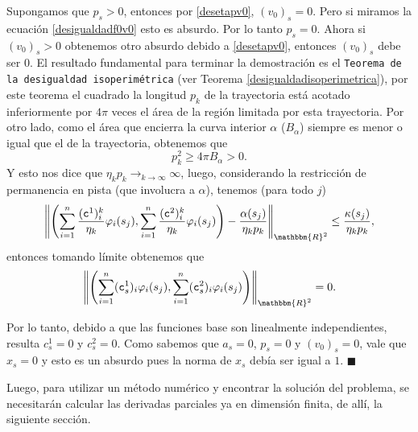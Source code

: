 \documentclass[a4paper,10pt]{book}
\newcommand{\R}{\mathbbm{R}}
\newenvironment{dem}{\vspace*{-0.1cm}{\it Demostraci\'on:}}{\hfill
$\blacksquare$\\}
\begin{document}
\begin{dem}
Supongamos que $p_s>0$, entonces por \eqref{desetapv0}, $(v_0)_s=0$. Pero si miramos la ecuación \eqref{desigualdadf0v0} esto es absurdo. Por lo tanto $p_s=0$. Ahora si $(v_0)_s>0$ obtenemos otro absurdo debido a \eqref{desetapv0}, entonces $(v_0)_s$ debe ser $0$. El resultado fundamental para terminar la demostración es el \texttt{Teorema de la desigualdad isoperimétrica} (ver Teorema \ref{desigualdadisoperimetrica}), por este teorema el cuadrado la longitud $p_k$ de la trayectoria está acotado inferiormente por $4\pi$ veces el área de la región limitada por esta trayectoria. Por otro lado, como el área que encierra la curva interior $\alpha$ ($B_\alpha$) siempre es menor o igual que el de la trayectoria, obtenemos que
\begin{equation*}
    p_k^2\geq 4\pi B_\alpha>0.
\end{equation*}
Y esto nos dice que $\displaystyle \eta_kp_k\mathop{\longrightarrow}_{k\to\infty}\infty$, luego, considerando la restricción de permanencia en pista (que involucra a $\alpha$), tenemos (para todo $j$)
\begin{equation*}
    \left\| \left(\sum_{i=1}^n\frac{(\texttt{c}^{1})^k_i}{\eta_k}\varphi_i(s_j), \sum_{i=1}^n\frac{(\texttt{c}^{2})^k_i}{\eta_k}\varphi_i(s_j)\right)-\frac{\alpha(s_j)}{\eta_kp_k} \right\|_{\R^2} \leq \frac{\kappa(s_j)}{\eta_kp_k},
\end{equation*}
entonces tomando límite obtenemos que
\[
 \left\|\left(\sum_{i=1}^n(\texttt{c}^1_s)_i\varphi_i(s_j), \sum_{i=1}^n(\texttt{c}^2_s)_i\varphi_i(s_j)\right)\right\|_{\R^2}=0.
\]


Por lo tanto, debido a que las funciones base son linealmente independientes, resulta $c^1_s=0$ y $c^2_s=0$. Como sabemos que $a_s=0$, $p_s=0$ y $(v_0)_s=0$, vale que $x_s=0$ y esto es un absurdo pues la norma de $x_s$ debía ser igual a $1$.
\end{dem}

Luego, para utilizar un método numérico y encontrar la solución del problema, se necesitarán calcular las derivadas parciales ya en dimensión finita, de allí, la siguiente sección.
\end{document}
